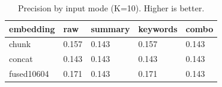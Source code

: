 \begin{table}
\caption{Precision by input mode (K=10). Higher is better.}
\label{tab:precision-by-mode}
\begin{tabular}{lllll}
\toprule
embedding & raw & summary & keywords & combo \\
\midrule
chunk & 0.157 & 0.143 & 0.157 & 0.143 \\
concat & 0.143 & 0.143 & 0.143 & 0.143 \\
fused10604 & 0.171 & 0.143 & 0.171 & 0.143 \\
\bottomrule
\end{tabular}
\end{table}
